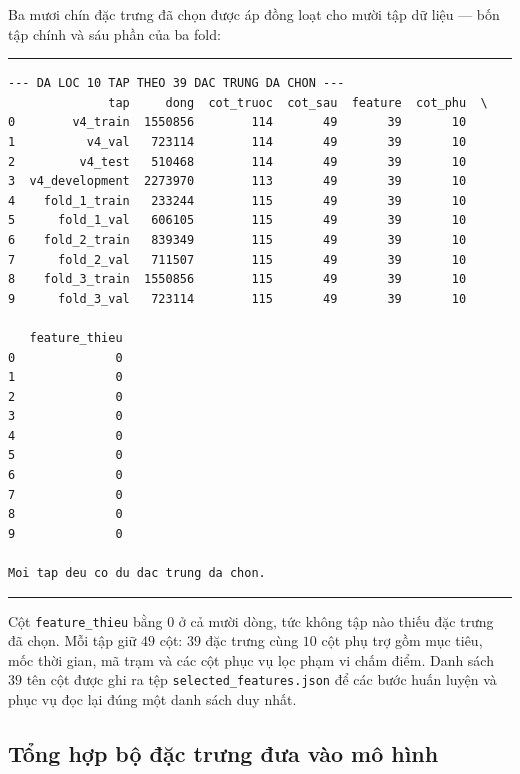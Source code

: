\documentclass[12pt, a4paper]{report}
\begin{document}
Ba mươi chín đặc trưng đã chọn được áp đồng loạt cho mười tập dữ liệu --- bốn tập chính và sáu phần
của ba fold:

\begingroup
\par\vspace{6pt}\hrule\vspace{4pt}
\small\renewcommand{\baselinestretch}{1.0}\selectfont
\begin{verbatim}
--- DA LOC 10 TAP THEO 39 DAC TRUNG DA CHON ---
              tap     dong  cot_truoc  cot_sau  feature  cot_phu  \
0        v4_train  1550856        114       49       39       10   
1          v4_val   723114        114       49       39       10   
2         v4_test   510468        114       49       39       10   
3  v4_development  2273970        113       49       39       10   
4    fold_1_train   233244        115       49       39       10   
5      fold_1_val   606105        115       49       39       10   
6    fold_2_train   839349        115       49       39       10   
7      fold_2_val   711507        115       49       39       10   
8    fold_3_train  1550856        115       49       39       10   
9      fold_3_val   723114        115       49       39       10   

   feature_thieu  
0              0  
1              0  
2              0  
3              0  
4              0  
5              0  
6              0  
7              0  
8              0  
9              0  

Moi tap deu co du dac trung da chon.
\end{verbatim}
\vspace{2pt}\hrule\par\vspace{6pt}
\endgroup

Cột \texttt{feature\_thieu} bằng $0$ ở cả mười dòng, tức không tập nào thiếu đặc trưng đã chọn.
Mỗi tập giữ $49$ cột: $39$ đặc trưng cùng $10$ cột phụ trợ gồm mục tiêu, mốc thời gian, mã trạm
và các cột phục vụ lọc phạm vi chấm điểm. Danh sách $39$ tên cột được ghi ra tệp
\texttt{selected\_features.json} để các bước huấn luyện và phục vụ đọc lại đúng một danh sách duy
nhất.

\FloatBarrier
\subsection{Tổng hợp bộ đặc trưng đưa vào mô hình}
\end{document}
